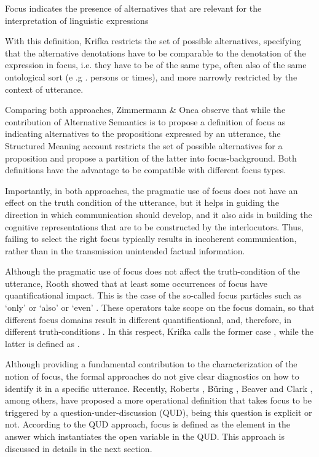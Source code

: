 \documentclass[12pt]{report}
\begin{document}
\ex Focus indicates the presence of alternatives that are relevant for the interpretation of linguistic expressions
\xe


\noindent
With this definition, Krifka restricts the set of possible alternatives, specifying that the alternative denotations have to be comparable to the denotation of the expression in focus, i.e. they have to be of the same type, often also of the same ontological sort (e .g . persons or times), and more narrowly restricted by the context of utterance. 

Comparing both approaches, Zimmermann \& Onea \cite{zimmermann2011grammatical} observe that while the contribution of Alternative Semantics is to propose a definition of focus as indicating alternatives to the propositions expressed by an utterance, the Structured Meaning account restricts the set of possible alternatives for a proposition and propose a partition of the latter into focus-background. Both definitions have the advantage to be compatible with different focus types. 


Importantly, in both approaches, the pragmatic use of focus does not have an effect on the truth condition of the utterance, but it helps in guiding the direction in which communication should develop, and it also aids in building the cognitive representations that are to be constructed by the interlocutors. Thus, failing to select the right focus typically results in incoherent communication, rather than in the transmission unintended factual information. 


Although the pragmatic use of focus does not affect the truth-condition of the utterance, Rooth \cite{rooth1985association} showed that at least some occurrences of focus have quantificational impact. This is the case of the so-called focus particles such as ‘only' or ‘also' or ‘even' \cite{konig1991identical}. These operators take scope on the focus domain, so that different focus domains result in different quantificational, and, therefore, in different truth-conditions \cite{dufter2009focus}.
In this respect, Krifka \cite{krifka2008basic} calls the former case , while the latter is defined as .


Although providing a fundamental contribution to the characterization of the notion of focus, the formal approaches do not give clear diagnostics on how to identify it in a specific utterance. 
Recently, Roberts \cite{roberts1996information}, Büring \cite{buring2003d}, Beaver and Clark \cite{beaver2008sense}, among others, have proposed a more operational definition that takes focus to be triggered by a question-under-discussion (QUD), being this question is explicit or not. According to the QUD approach, focus is defined as the element in the answer which instantiates the open variable in the QUD. This approach is discussed in details in the next section.\\
\end{document}
